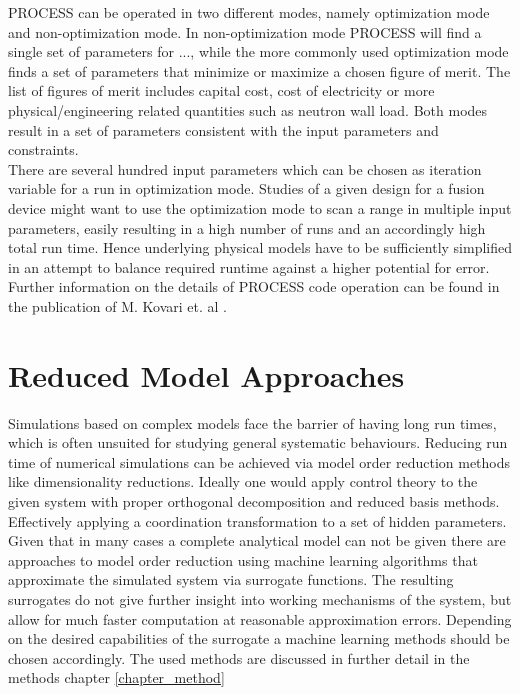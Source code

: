 	PROCESS can be operated in two different modes, namely optimization mode and non-optimization mode. In non-optimization mode PROCESS will find a single set of parameters for ..., while the more commonly used optimization mode finds a set of parameters that minimize or maximize a chosen figure of merit. The list of figures of merit includes capital cost, cost of electricity or more physical/engineering related quantities such as neutron wall load. Both modes result in a set of parameters consistent with the input parameters and constraints.\\ %
	There are several hundred input parameters which can be chosen as iteration variable for a run in optimization mode. Studies of a given design for a fusion device might want to use the optimization mode to scan a range in multiple input parameters, easily resulting in a high number of runs and an accordingly high total run time. Hence underlying physical models have to be sufficiently simplified in an attempt to balance required runtime against a higher potential for error.\\
	
	Further information on the details of PROCESS code operation can be found in the publication of M. Kovari et. al \cite{process}.\\
	
	\section{Reduced Model Approaches}
	Simulations based on complex models face the barrier of having long run times, which is often unsuited for studying general systematic behaviours. Reducing run time of numerical simulations can be achieved via model order reduction methods like dimensionality reductions.
	Ideally one would apply control theory to the given system with proper orthogonal decomposition and reduced basis methods. Effectively applying a coordination transformation to a set of hidden parameters.\\
	Given that in many cases a complete analytical model can not be given there are approaches to model order reduction using machine learning algorithms that approximate the simulated system via surrogate functions. The resulting surrogates do not give further insight into working mechanisms of the system, but allow for much faster computation at reasonable approximation errors. Depending on the desired capabilities of the surrogate a machine learning methods should be chosen accordingly. The used methods are discussed in further detail in the methods chapter \ref{chapter_method}
	
	
